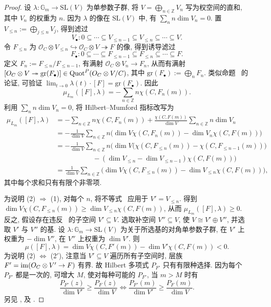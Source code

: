\begin{proof}
设 $\lambda:\mathbb G_m\to\mathrm{SL}(V)$ 为单参数子群, 将 $V=\bigoplus_{n\in\mathbb Z}V_n$ 写为权空间的直和, 其中 $V_n$ 的权重为 $n$. 因为 $\lambda$ 的像在 $\mathrm{SL}(V)$ 中, 有 $\sum_n n\dim V_n=0$. 置 $V_{\leq n}:=\bigoplus_{j\leq n}V_j$, 得到滤过
\[
V_\bullet:0\subseteq\cdots\subseteq V_{\leq n-1}\subseteq V_{\leq n}\subseteq\cdots\subseteq V.
\]
令 $F_{\leq n}$ 为 $\mathcal O_C\otimes V_{\leq n}\hookrightarrow\mathcal O_C\otimes V\twoheadrightarrow F$ 的像, 得到诱导滤过
\[
F_\bullet:0\subseteq\cdots\subseteq F_{\leq n-1}\subseteq F_{\leq n}\subseteq\cdots\subseteq F.
\]
定义 $F_n:=F_{\leq n}/F_{\leq n-1}$, 有满射 $\mathcal O_C\otimes V_n\to F_n$, 从而有满射 $[O_C\otimes V\twoheadrightarrow\mathrm{gr}(F_\bullet)]\in\operatorname{Quot}^P(O_C\otimes V/C)$, 其中 $\mathrm{gr}(F_\bullet):=\bigoplus_n F_n$. 类似命题~ 的论证, 可验证 $\lim_{t\to0}\lambda(t)\cdot[F]=\mathrm{gr}(F_\bullet)$. 因此
\[
\mu_{L_m}([F],\lambda)=-\sum_{n\in\mathbb Z}n\chi(C,F_n(m)).
\]
利用 $\sum_n n\dim V_n=0$, 将 Hilbert--Mumford 指标改写为
\[
\begin{aligned}
\mu_{L_m}([F],\lambda)&=-\sum_{n\in\mathbb Z}n\chi(C,F_n(m))+\frac{\chi(C,F(m))}{\dim V}\sum_{n\in\mathbb Z}n\dim V_n\\
&=-\frac1{\dim V}\sum_{n\in\mathbb Z}n\big(\dim V\chi(C,F_n(m))-\dim V_n\chi(C,F(m))\big)\\
&=-\frac1{\dim V}\sum_{n\in\mathbb Z}n\Big(\dim V\big(\chi(C,F_{\leq n}(m))-\chi(C,F_{\leq n-1}(m))\big)\\
&\hspace{65pt}-(\dim V_{\leq n}-\dim V_{\leq n-1})\chi(C,F(m))\Big)\\
&=\frac1{\dim V}\sum_{n\in\mathbb Z}\big(\dim V\chi(C,F_{\leq n}(m))-\dim V_{\leq n}\chi(C,F(m))\big),
\end{aligned}
\]
其中每个求和只有有限个非零项.

为说明 (2) $\Rightarrow$ (1), 对每个 $n$, 将不等式~ 应用于 $V'=V_{\leq n}$. 得到 $\dim V\chi(C,F_{\leq n}(m))\geq\dim V_{\leq n}\chi(C,F(m))$, 从而 $\mu_{L_m}([F],\lambda)\geq0$. 反之, 假设存在违反~ 的子空间 $V'\subseteq V$. 选取补空间 $V''\subseteq V$, 使 $V\cong V'\oplus V''$, 并选取 $V'$ 与 $V''$ 的基. 设 $\lambda:\mathbb G_m\to\mathrm{SL}(V)$ 为关于所选基的对角单参数子群, 在 $V'$ 上权重为 $-\dim V''$, 在 $V''$ 上权重为 $\dim V'$. 则
\[
\mu([F],\lambda)=\dim V\chi(C,F'(m))-\dim V'\chi(C,F(m))<0.
\]
为说明 (2) $\Leftrightarrow$ (2$'$), 注意当 $V'\subseteq V$ 遍历所有子空间时, 层族 $F'=\operatorname{im}(O_C\otimes V'\to F)$ 有界. 故 Hilbert 多项式 $P_{F'}$ 只有有限种选择. 因为每个 $P_{F'}$ 都是一次的, 可增大 $M$, 使对每种可能的 $P_{F'}$, 当 $m>M$ 时有
\[
\frac{P_{F'}(z)}{\dim V'}\geq\frac{P_F(z)}{\dim V}\iff\frac{P_{F'}(m)}{\dim V'}\geq\frac{P_F(m)}{\dim V}.
\]
另见 \cite[引理 1.15--16]{Sim94a}, \cite[引理 7.2.2]{Lan75} 及 \cite[引理 4.4.5--6]{HL10}.
\end{proof}
